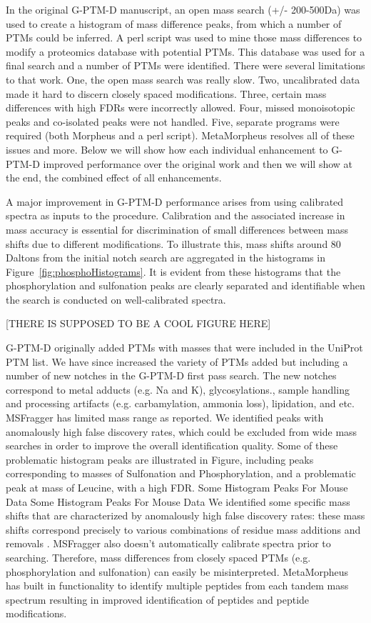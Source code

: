 \documentclass[journal=jprobs,manuscript=article]{achemso}
\begin{document}
In the original G-PTM-D manuscript, an open mass search (+/- 200-500Da) was used to create a histogram of mass difference peaks, from which a number of PTMs could be inferred.
A perl script was used to mine those mass differences to modify a proteomics database with potential PTMs.
This database was used for a final search and a number of PTMs were identified.
There were several limitations to that work.
One, the open mass search was really slow.
Two, uncalibrated data made it hard to discern closely spaced modifications.
Three, certain mass differences with high FDRs were incorrectly allowed.
Four, missed monoisotopic peaks and co-isolated peaks were not handled.
Five, separate programs were required (both Morpheus and a perl script).
MetaMorpheus resolves all of these issues and more.
Below we will show how each individual enhancement to G-PTM-D improved performance over the original work and then we will show at the end, the combined effect of all enhancements.

A major improvement in G-PTM-D performance arises from using calibrated spectra as inputs to the procedure. 
Calibration and the associated increase in mass accuracy is essential for discrimination of small differences between mass shifts due to different modifications.
To illustrate this, mass shifts around 80 Daltons from the initial notch search are aggregated in the histograms in Figure~\ref{fig:phosphoHistograms}.
It is evident from these histograms that the phosphorylation and sulfonation peaks are clearly separated and identifiable when the search is conducted on well-calibrated spectra.

[THERE IS SUPPOSED TO BE A COOL FIGURE HERE]

G-PTM-D originally added PTMs with masses that were included in the UniProt PTM list. 
We have since increased the variety of PTMs added but including a number of new notches in the G-PTM-D first pass search. The new notches correspond to metal adducts (e.g. Na and K), glycosylations., sample handling and processing artifacts (e.g. carbamylation, ammonia loss), lipidation, and etc.
MSFragger has limited mass range as reported. We identified peaks with anomalously high false discovery rates, which could be excluded from wide mass searches in order to improve the overall identification quality.
Some of these problematic histogram peaks are illustrated in Figure, including peaks corresponding to masses of Sulfonation and Phosphorylation, and a problematic peak at mass of Leucine, with a high FDR.
Some Histogram Peaks For Mouse Data Some Histogram Peaks For Mouse Data We identified some specific mass shifts that are characterized by anomalously high false discovery rates: these mass shifts correspond precisely to various combinations of residue mass additions and removals .
MSFragger also doesn’t automatically calibrate spectra prior to searching.
Therefore, mass differences from closely spaced PTMs (e.g. phosphorylation and sulfonation) can easily be misinterpreted.
MetaMorpheus has built in functionality to identify multiple peptides from each tandem mass spectrum resulting in improved identification of peptides and peptide modifications.
\end{document}
